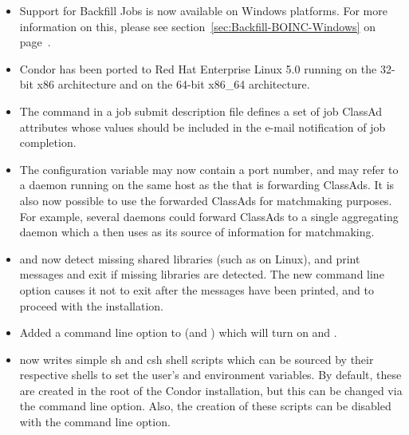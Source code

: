\begin{itemize}

\item Support for Backfill Jobs is now available on Windows platforms.
For more information on this, please see
section~\ref{sec:Backfill-BOINC-Windows} on
page~\pageref{sec:Backfill-BOINC-Windows}.

\item Condor has been ported to Red Hat Enterprise Linux
5.0 running on the 32-bit x86 architecture and on the 64-bit x86\_64
architecture.

\item The command  in a job submit
description file defines a set of job ClassAd attributes whose values
should be included in the e-mail notification of job completion.

\item The configuration variable  may now
contain a port number, and may refer to a
 daemon running on the same host as the
 that is forwarding ClassAds.  It is also now possible to
use the forwarded ClassAds for matchmaking purposes.  For example, several
 daemons could forward ClassAds to 
a single aggregating  daemon which
a  then uses as its source of information for
matchmaking.

\item {} and  now detect missing
  shared libraries (such as  on Linux), and print
  messages and exit if missing libraries are detected.  The new command
  line option  causes it not to exit
  after the messages have been printed, and to proceed with the
  installation.

\item Added a  command line option to 
  (and ) which will turn on  and
  .

\item {} now writes simple sh and csh shell scripts
  which can be sourced by their respective shells to set the user's
   and  environment variables.  By default, these
  are created in the root of the Condor installation, but this can be
  changed via the  command line option.  Also,
  the creation of these scripts can be disabled with the
   command line option.

\end{itemize}

